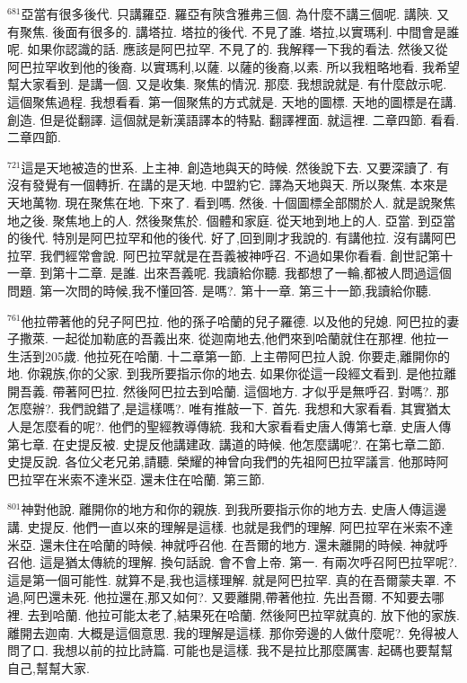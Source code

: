 \documentclass{book}
\begin{document}
$^{681}$亞當有很多後代.
只講羅亞.
羅亞有陝含雅弗三個.
為什麼不講三個呢.
講陝.
又有聚焦.
後面有很多的.
講塔拉.
塔拉的後代.
不見了誰.
塔拉,以實瑪利.
中間會是誰呢.
如果你認識的話.
應該是阿巴拉罕.
不見了的.
我解釋一下我的看法.
然後又從阿巴拉罕收到他的後裔.
以實瑪利,以薩.
以薩的後裔,以素.
所以我粗略地看.
我希望幫大家看到.
是講一個.
又是收集.
聚焦的情況.
那麼.
我想說就是.
有什麼啟示呢.
這個聚焦過程.
我想看看.
第一個聚焦的方式就是.
天地的圖標.
天地的圖標是在講.
創造.
但是從翻譯.
這個就是新漢語譯本的特點.
翻譯裡面.
就這裡.
二章四節.
看看.
二章四節.

$^{721}$這是天地被造的世系.
上主神.
創造地與天的時候.
然後說下去.
又要深讀了.
有沒有發覺有一個轉折.
在講的是天地.
中盟約它.
譯為天地與天.
所以聚焦.
本來是天地萬物.
現在聚焦在地.
下來了.
看到嗎.
然後.
十個圖標全部關於人.
就是說聚焦地之後.
聚焦地上的人.
然後聚焦於.
個體和家庭.
從天地到地上的人.
亞當.
到亞當的後代.
特別是阿巴拉罕和他的後代.
好了,回到剛才我說的.
有講他拉.
沒有講阿巴拉罕.
我們經常會說.
阿巴拉罕就是在吾義被神呼召.
不過如果你看看.
創世記第十一章.
到第十二章.
是誰.
出來吾義呢.
我讀給你聽.
我都想了一輪,都被人問過這個問題.
第一次問的時候,我不懂回答.
是嗎?.
第十一章.
第三十一節,我讀給你聽.

$^{761}$他拉帶著他的兒子阿巴拉.
他的孫子哈蘭的兒子羅德.
以及他的兒媳.
阿巴拉的妻子撒萊.
一起從加勒底的吾義出來.
從迦南地去,他們來到哈蘭就住在那裡.
他拉一生活到205歲.
他拉死在哈蘭.
十二章第一節.
上主帶阿巴拉人說.
你要走,離開你的地.
你親族,你的父家.
到我所要指示你的地去.
如果你從這一段經文看到.
是他拉離開吾義.
帶著阿巴拉.
然後阿巴拉去到哈蘭.
這個地方.
才似乎是無呼召.
對嗎?.
那怎麼辦?.
我們說錯了,是這樣嗎?.
唯有推敲一下.
首先.
我想和大家看看.
其實猶太人是怎麼看的呢?.
他們的聖經教導傳統.
我和大家看看史唐人傳第七章.
史唐人傳第七章.
在史提反被.
史提反他講建政.
講道的時候.
他怎麼講呢?.
在第七章二節.
史提反說.
各位父老兄弟,請聽.
榮耀的神曾向我們的先祖阿巴拉罕議言.
他那時阿巴拉罕在米索不達米亞.
還未住在哈蘭.
第三節.

$^{801}$神對他說.
離開你的地方和你的親族.
到我所要指示你的地方去.
史唐人傳這邊講.
史提反.
他們一直以來的理解是這樣.
也就是我們的理解.
阿巴拉罕在米索不達米亞.
還未住在哈蘭的時候.
神就呼召他.
在吾爾的地方.
還未離開的時候.
神就呼召他.
這是猶太傳統的理解.
換句話說.
會不會上帝.
第一.
有兩次呼召阿巴拉罕呢?.
這是第一個可能性.
就算不是,我也這樣理解.
就是阿巴拉罕.
真的在吾爾蒙夫罩.
不過,阿巴還未死.
他拉還在,那又如何?.
又要離開,帶著他拉.
先出吾爾.
不知要去哪裡.
去到哈蘭.
他拉可能太老了,結果死在哈蘭.
然後阿巴拉罕就真的.
放下他的家族.
離開去迦南.
大概是這個意思.
我的理解是這樣.
那你旁邊的人做什麼呢?.
免得被人問了口.
我想以前的拉比詩篇.
可能也是這樣.
我不是拉比那麼厲害.
起碼也要幫幫自己,幫幫大家.
\end{document}
